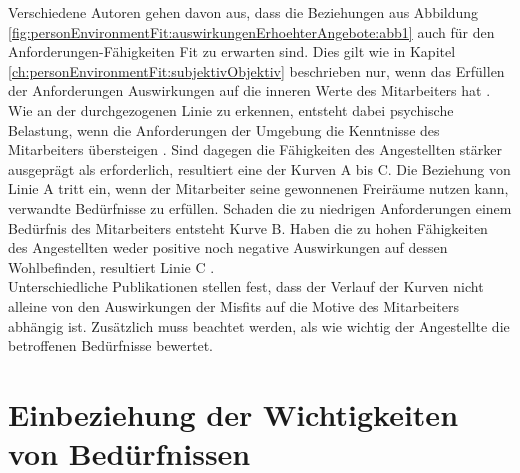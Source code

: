 Verschiedene Autoren gehen davon aus, dass die Beziehungen aus Abbildung \ref{fig:personEnvironmentFit:auswirkungenErhoehterAngebote:abb1} auch für den Anforderungen-Fähigkeiten Fit zu erwarten sind. Dies gilt wie in Kapitel \ref{ch:personEnvironmentFit:subjektivObjektiv} beschrieben nur, wenn das Erfüllen der Anforderungen Auswirkungen auf die inneren Werte des Mitarbeiters hat \cite{mechanismsOfJobStressAndStrain:1982, harrison:1978}. Wie an der durchgezogenen Linie zu erkennen, entsteht dabei psychische Belastung, wenn die Anforderungen der Umgebung die Kenntnisse des Mitarbeiters übersteigen \cite[S. 5]{schuler:1980}. Sind dagegen die Fähigkeiten des Angestellten stärker ausgeprägt als erforderlich, resultiert eine der Kurven A bis C. Die Beziehung von Linie A tritt ein, wenn der Mitarbeiter seine gewonnenen Freiräume nutzen kann, verwandte Bedürfnisse zu erfüllen. Schaden die zu niedrigen Anforderungen einem Bedürfnis des Mitarbeiters entsteht Kurve B. Haben die zu hohen Fähigkeiten des Angestellten weder positive noch negative Auswirkungen auf dessen Wohlbefinden, resultiert Linie C \cite[S. 22f.]{edwards:2008}.\\
Unterschiedliche Publikationen stellen fest, dass der Verlauf der Kurven nicht alleine von den Auswirkungen der Misfits auf die Motive des Mitarbeiters abhängig ist. Zusätzlich muss beachtet werden, als wie wichtig der Angestellte die betroffenen Bedürfnisse bewertet. 

\section{Einbeziehung der Wichtigkeiten von Bedürfnissen}
\label{ch:personEnvironmentFit:wichtigkeiten}


